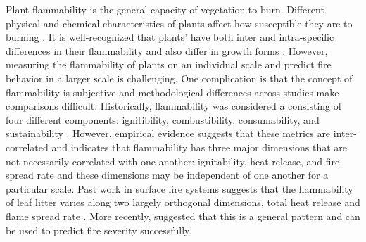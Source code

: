 \documentclass[12pt]{report}
\begin{document}
Plant flammability is the general capacity of vegetation to burn. Different physical and chemical characteristics of plants affect how susceptible they are to burning \citep{bond1996fire}. It is well-recognized that plants' have both inter and intra-specific differences in their flammability \citep{pausas2012fire, battersby2017exploring, cui2020shoot, cui2022intraspecific} and also differ in growth forms \citep{calitz2015investigating, jaureguiberry2011device, zanzarini2022flammability, potts2022growth, cui2020shoot, wyse2016quantitative}. However, measuring the flammability of plants on an individual scale and predict fire behavior in a larger scale is challenging. One complication is that the concept of flammability is subjective \citep{gill2005flammability} and methodological differences across studies make comparisons difficult. Historically, flammability was considered a consisting of four different components: ignitibility, combustibility, consumability, and sustainability \citep{anderson1970forest, martin1993assessing}. However, empirical evidence suggests that these metrics are inter-correlated and indicates that flammability has three major dimensions that are not necessarily correlated with one another: ignitability, heat release, and fire spread rate \citep{pausas2017flammability} and these dimensions may be independent of one another for a particular scale. Past work in surface fire systems suggests that the flammability of leaf litter varies along two largely orthogonal dimensions, total heat release and flame spread rate \citep{de2012leaf}. More recently, \citep{prior2018conceptualizing} suggested that this is a general pattern and can be used to predict fire severity successfully. \\
\end{document}
